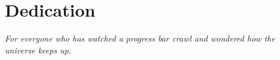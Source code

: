 \chapter*{Dedication}

\begin{center}
\textit{For everyone who has watched a progress bar crawl and wondered how the universe keeps up.}
\end{center}
